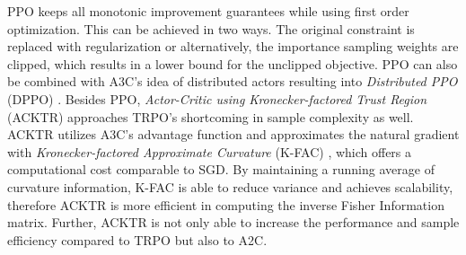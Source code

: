     PPO keeps all monotonic improvement guarantees while using first order optimization. This can be achieved in two ways. The original constraint is replaced with regularization or alternatively, the importance sampling weights are clipped, which results in a lower bound for the unclipped objective.
    PPO can also be combined with A3C's idea of distributed actors resulting into \textit{Distributed PPO} (DPPO) \cite{Heess2017}. 
    Besides PPO, \textit{Actor-Critic using Kronecker-factored Trust Region} (ACKTR) \cite{Wu2017} approaches TRPO's shortcoming in sample complexity as well.
    ACKTR utilizes A3C's advantage function and approximates the natural gradient with \textit{Kronecker-factored Approximate Curvature} (K-FAC) \cite{Martens2015}, which offers a computational cost comparable to SGD. 
    By maintaining a running average of curvature information, K-FAC is able to reduce variance and achieves scalability, therefore ACKTR is more efficient in computing the inverse Fisher Information matrix. 
    Further, ACKTR is not only able to increase the performance and sample efficiency compared to TRPO but also to A2C. 
	

